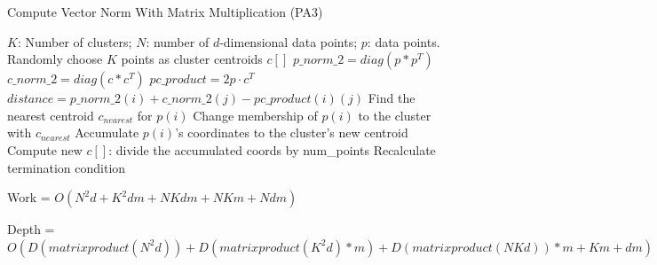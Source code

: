 \documentclass[
nopagebreaks,
style=klope,
fleqn]{powerdot}
\begin{document}
\begin{slide}{Compute Vector Norm With Matrix Multiplication (PA3)}
  \scriptsize
  \begin{algorithmic}[1]
    \INPUT $K$: Number of clusters; $N$: number of $d$-dimensional data points; $p$: data points.
     \label{alg:pm2}
    \State Randomly choose $K$ points as cluster centroids $c[]$
    \State $p\_norm\_2 = diag(p * p^T)$
    \State $c\_norm\_2 = diag(c * c^T)$
    \State $pc\_product = 2 p \cdot c^T$
    \State $distance = p\_norm\_2(i) + c\_norm\_2(j) - pc\_product(i)(j)$
    \EndFor
    \State Find the nearest centroid $c_{nearest}$ for $p(i)$
    \State Change membership of $p(i)$ to the cluster with $c_{nearest}$
    \State Accumulate $p(i)$'s coordinates to the cluster's new centroid
    \EndParFor
    \State Compute new $c[]$: divide the accumulated coords by num\_points
    \State Recalculate termination condition
    \EndWhile
    \EndFunction
  \end{algorithmic}
  \vspace{.1cm}
  \begin{compactitem}
  \item{Work = $O(N^2d + K^2dm + NKdm + NKm + Ndm)$}
  \item{Depth = $O(D(matrix product(N^2d)) + D(matrix product(K^2d)*m) + D(matrix product(NKd))*m+ Km + dm)$}
  \end{compactitem}
\end{slide}
\end{document}
